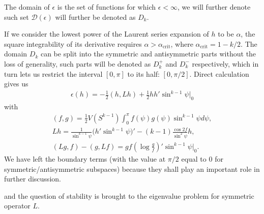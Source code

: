 The domain of $\epsilon$ is the set of functions for which
$\epsilon<\infty$, we will further denote such set
$\mathcal{D}(\epsilon)$ will further be denoted as $D_k$.


If we consider the lowest power of the Laurent series expansion of $h$
to be $\alpha$, the square integrability of its derivative requires
$\alpha>\alpha_{\text{crit}}$, where $\alpha_{\text{crit}}=1-k/2$. The
domain $D_k$ can be split into the symmetric and antisymmetric parts
without the loss of generality, such parts will be denoted as $D^+_k$
and $D^-_k$ respectively, which in turn lets us restrict the interval
$[0,\pi]$ to its half: $[0,\pi/2]$. Direct calculation gives us
\begin{gather}
  \epsilon(h)=-\frac{1}{2}(h,Lh)+\frac{1}{2}hh'\sin^{k-1}\psi\bigg|_0
\end{gather}
with
\begin{gather}
  (f,g)=\frac{1}{2}V(S^{k-1})\int_0^\pi f(\psi) g(\psi) \sin^{k-1}\psi d\psi,\\
  Lh=\frac{1}{\sin^{k-1}\psi}\big(h'\sin^{k-1}\psi\big)'-(k-1)\frac{\cos 2 f}{\sin^2\psi}h,\\
  (Lg,f)-(g,Lf)=gf\left(\log\frac{g}{f}\right)'\sin^{k-1}\psi\bigg|_0.
\end{gather}
We have left the boundary terms (with the value at $\pi/2$ equal to
$0$ for symmetric/antisymmetric subspaces) because they shall play an
important role in further discussion.

and the question of stability is brought to the eigenvalue problem for
symmetric operator $L$.\\

